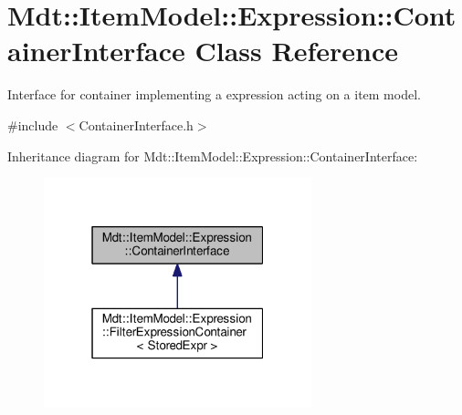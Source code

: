 \hypertarget{class_mdt_1_1_item_model_1_1_expression_1_1_container_interface}{}\section{Mdt\+:\+:Item\+Model\+:\+:Expression\+:\+:Container\+Interface Class Reference}
\label{class_mdt_1_1_item_model_1_1_expression_1_1_container_interface}


Interface for container implementing a expression acting on a item model.  




{\ttfamily \#include $<$Container\+Interface.\+h$>$}



Inheritance diagram for Mdt\+:\+:Item\+Model\+:\+:Expression\+:\+:Container\+Interface\+:\nopagebreak
\begin{figure}[H]
\begin{center}
\leavevmode
\includegraphics[width=220pt]{class_mdt_1_1_item_model_1_1_expression_1_1_container_interface__inherit__graph}
\end{center}
\end{figure}
